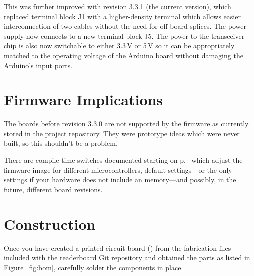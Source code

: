 This was further improved with revision 3.3.1 (the current version), which replaced terminal block J1 with a higher-density terminal
which allows easier interconnection of two  cables without the need for off-board splices. The power supply now connects to
a new terminal block J5. The power to the  transceiver chip is also now switchable to either 3.3\,V or 5\,V so it can be
appropriately matched to the operating voltage of the Arduino board without damaging the Arduino's input ports.

\section{Firmware Implications}
The boards before  revision 3.3.0 are not supported by the firmware as currently stored in the project repository. They were prototype ideas
which were never built, so this shouldn't be a problem. 

There are compile-time switches documented starting on p.~\pageref{config-fw} which adjust the firmware
image for different microcontrollers, default settings---or the only settings if your hardware does not
include an  memory---and possibly, in the future, different board revisions.

\section{Construction}
Once you have created a printed circuit board () from the fabrication files included with the
readerboard Git repository and obtained the parts as listed in Figure~\ref{fig:bom}, carefully solder the components
in place. 

